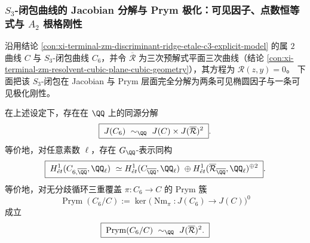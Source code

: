 \subsubsection{\texorpdfstring{$S_3$}{S3}-闭包曲线的 Jacobian 分解与 Prym 极化：可见因子、点数恒等式与 \texorpdfstring{$A_2$}{A2} 根格刚性}\label{par:xi-terminal-zm-s3-closure-jacobian-prym-a2}
沿用结论 \ref{con:xi-terminal-zm-discriminant-ridge-etale-c3-explicit-model} 的属 \(2\) 曲线 \(C\) 与 \(S_3\)-闭包曲线 \(C_6\)，并令 \(\overline{\mathcal R}\) 为三次预解式平面三次曲线（结论 \ref{con:xi-terminal-zm-resolvent-cubic-plane-cubic-geometry}），其方程为 \(\mathscr R(z,y)=0\)。
下面把该 \(S_3\)-闭包在 Jacobian 与 Prym 层面完全分解为两条可见椭圆因子与一条可见极化刚性。

\begin{theorem}\label{thm:xi-terminal-zm-s3-closure-jacobian-splitting}
在上述设定下，存在在 \(\QQ\) 上的同源分解
\[
\boxed{\;
J(C_6)\ \sim_{\QQ}\ J(C)\times J(\overline{\mathcal R})^{2}\; }.
\]
等价地，对任意素数 \(\ell\)，存在 \(G_{\QQ}\)-表示同构
\[
\boxed{\;
H^1_{\acute et}(C_{6,\overline{\QQ}},\QQ_\ell)\ \simeq
H^1_{\acute et}(C_{\overline{\QQ}},\QQ_\ell)\ \oplus
H^1_{\acute et}(\overline{\mathcal R}_{\overline{\QQ}},\QQ_\ell)^{\oplus2}\; }.
\]
等价地，对无分歧循环三重覆盖 \(\pi:C_6\to C\) 的 Prym 簇
\[
\operatorname{Prym}(C_6/C):=\ker\!\bigl(\operatorname{Nm}_{\pi}:J(C_6)\to J(C)\bigr)^{0}
\]
成立
\[
\boxed{\;\operatorname{Prym}(C_6/C)\ \sim_{\QQ}\ J(\overline{\mathcal R})^{2}.\;}
\]
\end{theorem}
